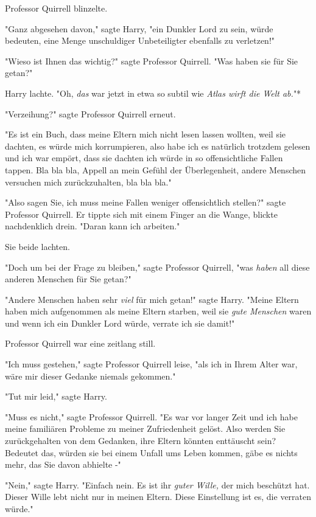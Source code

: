 {Professor Quirrell blinzelte.

"Ganz abgesehen davon," sagte Harry, "ein Dunkler Lord zu sein, würde bedeuten, eine Menge unschuldiger Unbeteiligter ebenfalls zu verletzen!"

"Wieso ist Ihnen das wichtig?" sagte Professor Quirrell. "Was haben sie für Sie getan?"

Harry lachte. "Oh, \emph{das} war jetzt in etwa so subtil wie \emph{Atlas wirft die Welt ab.}"*

"Verzeihung?" sagte Professor Quirrell erneut.

"Es ist ein Buch, dass meine Eltern mich nicht lesen lassen wollten, weil sie dachten, es würde mich korrumpieren, also habe ich es natürlich trotzdem gelesen und ich war empört, dass sie dachten ich würde in so offensichtliche Fallen tappen. Bla bla bla, Appell an mein Gefühl der Überlegenheit, andere Menschen versuchen mich zurückzuhalten, bla bla bla."

"Also sagen Sie, ich muss meine Fallen weniger offensichtlich stellen?" sagte Professor Quirrell. Er tippte sich mit einem Finger an die Wange, blickte nachdenklich drein. "Daran kann ich arbeiten."

Sie beide lachten.

"Doch um bei der Frage zu bleiben," sagte Professor Quirrell, "was \emph{haben} all diese anderen Menschen für Sie getan?"

"Andere Menschen haben sehr \emph{viel} für mich getan!" sagte Harry. "Meine Eltern haben mich aufgenommen als meine Eltern starben, weil sie \emph{gute Menschen} waren und wenn ich ein Dunkler Lord würde, verrate ich sie damit!"

Professor Quirrell war eine zeitlang still.

"Ich muss gestehen," sagte Professor Quirrell leise, "als ich in Ihrem Alter war, wäre mir dieser Gedanke niemals gekommen."

"Tut mir leid," sagte Harry.

"Muss es nicht," sagte Professor Quirrell. "Es war vor langer Zeit und ich habe meine familiären Probleme zu meiner Zufriedenheit gelöst. Also werden Sie zurückgehalten von dem Gedanken, ihre Eltern könnten enttäuscht sein? Bedeutet das, würden sie bei einem Unfall ums Leben kommen, gäbe es nichts mehr, das Sie davon abhielte -"

"Nein," sagte Harry. "Einfach nein. Es ist ihr \emph{guter Wille,} der mich beschützt hat. Dieser Wille lebt nicht nur in meinen Eltern. Diese Einstellung ist es, die verraten würde."

}
